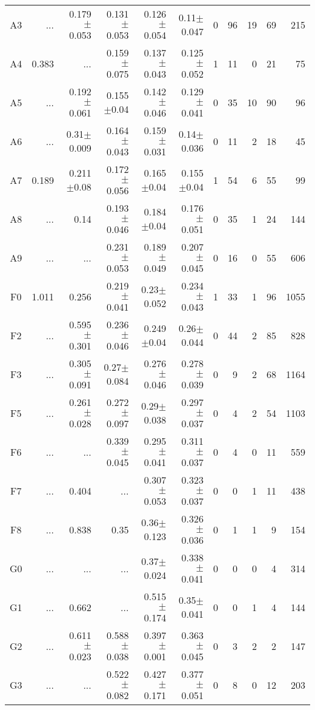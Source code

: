 \begin{table}[t]
\begin{table}[t]
\begin{center}
\begin{tabular}{c|rrrrr|rrrrr}
        A3	&	 ...	&	0.179$\pm$0.053	&	0.131$\pm$0.053	&	0.126$\pm$0.054	&	0.11$\pm$0.047	&	0	&	96	&	19	&	69	&	215	\\
        A4	&	0.383	&	 ...	&	0.159$\pm$0.075	&	0.137$\pm$0.043	&	0.125$\pm$0.052	&	1	&	11	&	0	&	21	&	75	\\
        A5	&	 ...	&	0.192$\pm$0.061	&	0.155$\pm$0.04	&	0.142$\pm$0.046	&	0.129$\pm$0.041	&	0	&	35	&	10	&	90	&	96	\\
        A6	&	 ...	&	0.31$\pm$0.009	&	0.164$\pm$0.043	&	0.159$\pm$0.031	&	0.14$\pm$0.036	&	0	&	11	&	2	&	18	&	45	\\
        A7	&	0.189	&	0.211$\pm$0.08	&	0.172$\pm$0.056	&	0.165$\pm$0.04	&	0.155$\pm$0.04	&	1	&	54	&	6	&	55	&	99	\\
        A8	&	 ...	&	0.14	&	0.193$\pm$0.046	&	0.184$\pm$0.04	&	0.176$\pm$0.051	&	0	&	35	&	1	&	24	&	144	\\
        A9	&	 ...	&	 ...	&	0.231$\pm$0.053	&	0.189$\pm$0.049	&	0.207$\pm$0.045	&	0	&	16	&	0	&	55	&	606	\\
        F0	&	1.011	&	0.256	&	0.219$\pm$0.041	&	0.23$\pm$0.052	&	0.234$\pm$0.043	&	1	&	33	&	1	&	96	&	1055	\\
        F2	&	 ...	&	0.595$\pm$0.301	&	0.236$\pm$0.046	&	0.249$\pm$0.04	&	0.26$\pm$0.044	&	0	&	44	&	2	&	85	&	828	\\
        F3	&	 ...	&	0.305$\pm$0.091	&	0.27$\pm$0.084	&	0.276$\pm$0.046	&	0.278$\pm$0.039	&	0	&	9	&	2	&	68	&	1164	\\
        F5	&	 ...	&	0.261$\pm$0.028	&	0.272$\pm$0.097	&	0.29$\pm$0.038	&	0.297$\pm$0.037	&	0	&	4	&	2	&	54	&	1103	\\
        F6	&	 ...	&	 ...	&	0.339$\pm$0.045	&	0.295$\pm$0.041	&	0.311$\pm$0.037	&	0	&	4	&	0	&	11	&	559	\\
        F7	&	 ...	&	0.404	&	 ...	&	0.307$\pm$0.053	&	0.323$\pm$0.037	&	0	&	0	&	1	&	11	&	438	\\
        F8	&	 ...	&	0.838	&	0.35	&	0.36$\pm$0.123	&	0.326$\pm$0.036	&	0	&	1	&	1	&	9	&	154	\\
        G0	&	 ...	&	 ...	&	 ...	&	0.37$\pm$0.024	&	0.338$\pm$0.041	&	0	&	0	&	0	&	4	&	314	\\
        G1	&	 ...	&	0.662	&	 ...	&	0.515$\pm$0.174	&	0.35$\pm$0.041	&	0	&	0	&	1	&	4	&	144	\\
        G2	&	 ...	&	0.611$\pm$0.023	&	0.588$\pm$0.038	&	0.397$\pm$0.001	&	0.363$\pm$0.045	&	0	&	3	&	2	&	2	&	147	\\
        G3	&	 ...	&	 ...	&	0.522$\pm$0.082	&	0.427$\pm$0.171	&	0.377$\pm$0.051	&	0	&	8	&	0	&	12	&	203	\\

\end{tabular}
\end{center}
\end{table}
\end{table}
